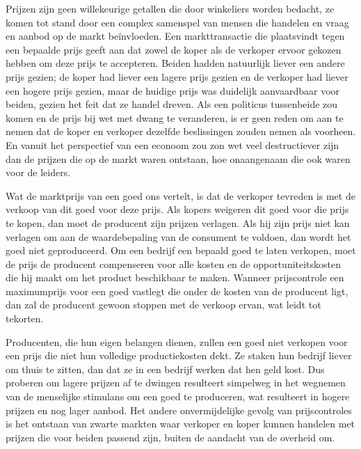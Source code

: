 Prijzen zijn geen willekeurige getallen die door winkeliers worden bedacht, ze komen tot stand door een complex samenspel van mensen die handelen en vraag en aanbod op de markt beïnvloeden. Een markttransactie die plaatsvindt tegen een bepaalde prijs geeft aan dat zowel de koper als de verkoper ervoor gekozen hebben om deze prijs te accepteren. Beiden hadden natuurlijk liever een andere prijs gezien; de koper had liever een lagere prijs gezien en de verkoper had liever een hogere prijs gezien, maar de huidige prijs was duidelijk aanvaardbaar voor beiden, gezien het feit dat ze handel dreven. Als een politicus tussenbeide zou komen en de prijs bij wet met dwang te veranderen, is er geen reden om aan te nemen dat de koper en verkoper dezelfde beslissingen zouden nemen als voorheen. En vanuit het perspectief van een econoom zou zo\textquotesingle n wet veel destructiever zijn dan de prijzen die op de markt waren ontstaan, hoe onaangenaam die ook waren voor de leiders.

Wat de marktprijs van een goed ons vertelt, is dat de verkoper tevreden is met de verkoop van dit goed voor deze prijs. Als kopers weigeren dit goed voor die prijs te kopen, dan moet de producent zijn prijzen verlagen. Als hij zijn prijs niet kan verlagen om aan de waardebepaling van de consument te voldoen, dan wordt het goed niet geproduceerd. Om een bedrijf een bepaald goed te laten verkopen, moet de prijs de producent compenseren voor alle kosten en de opportuniteitskosten die hij maakt om het product beschikbaar te maken. Wanneer prijscontrole een maximumprijs voor een goed vastlegt die onder de kosten van de producent ligt, dan zal de producent gewoon stoppen met de verkoop ervan, wat leidt tot tekorten.

Producenten, die hun eigen belangen dienen, zullen een goed niet verkopen voor een prijs die niet hun volledige productiekosten dekt. Ze staken hun bedrijf liever om thuis te zitten, dan dat ze in een bedrijf werken dat hen geld kost. Dus proberen om lagere prijzen af te dwingen resulteert simpelweg in het wegnemen van de menselijke stimulans om een goed te produceren, wat resulteert in hogere prijzen en nog lager aanbod. Het andere onvermijdelijke gevolg van prijscontroles is het ontstaan van zwarte markten waar verkoper en koper kunnen handelen met prijzen die voor beiden passend zijn, buiten de aandacht van de overheid om.
